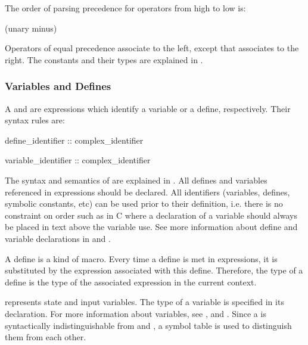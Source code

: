 \noindent The order of parsing precedence for operators from high to
low is:
%
\begin{Grammar}
      \operator{!}
      \operator{[ : ]}
      \operator{::}
      \operator{-} (unary minus)
      \operator{*}   \operator{/}
      \operator{+}   \operator{-}
      \operator{<<}   \operator{>>}
      \operator{=}   \operator{!=}   \operator{<}   \operator{>}   \operator{<=}   \operator{>=}
      \operator{\&}
      \operator{|}      
      \operator{<->}
      \operator{->}
\end{Grammar}
%
Operators of equal precedence associate to the left, except \operator{->}
that associates to the right.
%
The constants and their types are explained in .

\subsubsection{Variables and Defines}
\label{Variables and Defines}

A  and  are
expressions which identify a variable or a define, respectively. 
%
Their syntax rules are:

\begin{Grammar}
define_identifier :: complex_identifier

variable_identifier :: complex_identifier
\end{Grammar}
%
The syntax and semantics of  are explained
in .  
%
All defines and variables referenced in expressions should be
declared. All identifiers (variables, defines, symbolic constants,
etc) can be used prior to their definition, i.e. there is no constraint on
order such as in C where a declaration of a variable should always be
placed in text above the variable use.
%
See more information about define and variable declarations in
 and .

A define is a kind of macro. 
%
Every time a define is met in expressions, it is substituted by the
expression associated with this define. 
%
Therefore, the type of a define is the type of the associated
expression in the current context.

 represents state and input
variables. 
%
The type of a variable is specified in its declaration. 
%
For more information about variables, see ,  and .
%
Since a  is syntactically indistinguishable
from  and
, a symbol table is used to distinguish
them from each other.

